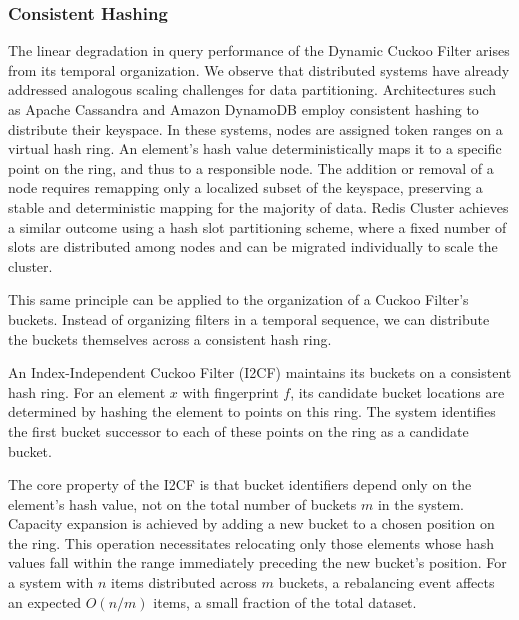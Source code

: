 \subsubsection{Consistent Hashing}

The linear degradation in query performance of the Dynamic Cuckoo Filter arises from its temporal organization. We observe that distributed systems have already addressed analogous scaling challenges for data partitioning. Architectures such as Apache Cassandra \cite{Lakshman2010CassandraAD} and Amazon DynamoDB \cite{Lakshman2010CassandraAD} employ consistent hashing to distribute their keyspace. In these systems, nodes are assigned token ranges on a virtual hash ring. An element's hash value deterministically maps it to a specific point on the ring, and thus to a responsible node. The addition or removal of a node requires remapping only a localized subset of the keyspace, preserving a stable and deterministic mapping for the majority of data. Redis Cluster \cite{redis-cluster-spec} achieves a similar outcome using a hash slot partitioning scheme, where a fixed number of slots are distributed among nodes and can be migrated individually to scale the cluster.

This same principle can be applied to the organization of a Cuckoo Filter's buckets. Instead of organizing filters in a temporal sequence, we can distribute the buckets themselves across a consistent hash ring.

\begin{definition} \label{def:I2CF}
    An Index-Independent Cuckoo Filter (I2CF) maintains its buckets on a consistent hash ring. For an element $x$ with fingerprint $f$, its candidate bucket locations are determined by hashing the element to points on this ring. The system identifies the first bucket successor to each of these points on the ring as a candidate bucket.
\end{definition}

The core property of the I2CF is that bucket identifiers depend only on the element's hash value, not on the total number of buckets $m$ in the system. Capacity expansion is achieved by adding a new bucket to a chosen position on the ring. This operation necessitates relocating only those elements whose hash values fall within the range immediately preceding the new bucket's position. For a system with $n$ items distributed across $m$ buckets, a rebalancing event affects an expected $O(n/m)$ items, a small fraction of the total dataset.

